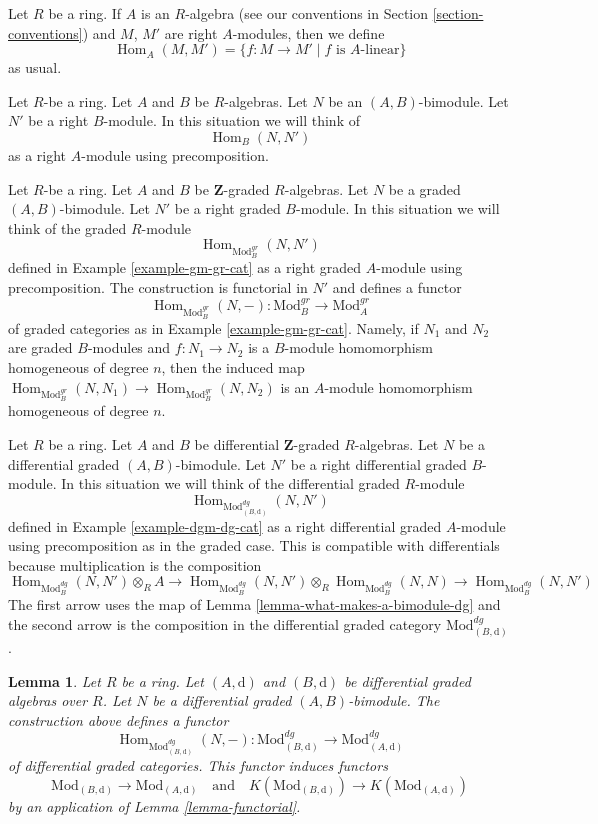 \documentclass{stacks-project}
\theoremstyle{plain}
\newtheorem{lemma}[subsection]{Lemma}
\theoremstyle{definition}
\theoremstyle{remark}
\numberwithin{equation}{subsection}
\def\Hom{\mathop{\mathrm{Hom}}\nolimits}
\begin{document}
\noindent
Let $R$ be a ring. If $A$ is an $R$-algebra (see our conventions
in Section \ref{section-conventions}) and $M$, $M'$ are right
$A$-modules, then we define
$$
\Hom_A(M, M') = \{f : M \to M' \mid f \text{ is }A\text{-linear}\}
$$
as usual.

\medskip\noindent
Let $R$-be a ring. Let $A$ and $B$ be $R$-algebras. Let
$N$ be an $(A, B)$-bimodule. Let $N'$ be a right $B$-module.
In this situation we will think of
$$
\Hom_B(N, N')
$$
as a right $A$-module using precomposition.

\medskip\noindent
Let $R$-be a ring. Let $A$ and $B$ be $\mathbf{Z}$-graded $R$-algebras. Let
$N$ be a graded $(A, B)$-bimodule. Let $N'$ be a right graded $B$-module.
In this situation we will think of the graded $R$-module
$$
\Hom_{\text{Mod}^{gr}_B}(N, N')
$$
defined in Example \ref{example-gm-gr-cat} as a right graded $A$-module
using precomposition. The construction is functorial in $N'$ and defines
a functor
$$
\Hom_{\text{Mod}^{gr}_B}(N, -) :
\text{Mod}^{gr}_B
\longrightarrow
\text{Mod}^{gr}_A
$$
of graded categories as in Example \ref{example-gm-gr-cat}. Namely, if
$N_1$ and $N_2$ are graded $B$-modules and $f : N_1 \to N_2$ is a $B$-module
homomorphism homogeneous of degree $n$, then the induced map
$\Hom_{\text{Mod}^{gr}_B}(N, N_1) \to \Hom_{\text{Mod}^{gr}_B}(N, N_2)$
is an $A$-module homomorphism homogeneous of degree $n$.

\medskip\noindent
Let $R$ be a ring. Let $A$ and $B$ be differential $\mathbf{Z}$-graded
$R$-algebras. Let $N$ be a differential graded $(A, B)$-bimodule.
Let $N'$ be a right differential graded $B$-module. In this situation
we will think of the differential graded $R$-module
$$
\Hom_{\text{Mod}^{dg}_{(B, \text{d})}}(N, N')
$$
defined in Example \ref{example-dgm-dg-cat} as a right differential
graded $A$-module using precomposition as in the graded case. This
is compatible with differentials because multiplication is the
composition
$$
\Hom_{\text{Mod}^{dg}_B}(N, N') \otimes_R A \to
\Hom_{\text{Mod}^{dg}_B}(N, N') \otimes_R
\Hom_{\text{Mod}^{dg}_B}(N, N) \to
\Hom_{\text{Mod}^{dg}_B}(N, N')
$$
The first arrow uses the map
of Lemma \ref{lemma-what-makes-a-bimodule-dg} and the second
arrow is the composition in the differential graded category
$\text{Mod}^{dg}_{(B, \text{d})}$.

\begin{lemma}
\label{lemma-hom}
Let $R$ be a ring. Let $(A, \text{d})$ and $(B, \text{d})$
be differential graded algebras over $R$. Let $N$ be a
differential graded $(A, B)$-bimodule. The construction above
defines a functor
$$
\Hom_{\text{Mod}^{dg}_{(B, \text{d})}}(N, -) :
\text{Mod}^{dg}_{(B, \text{d})}
\longrightarrow
\text{Mod}^{dg}_{(A, \text{d})}
$$
of differential graded categories. This functor induces functors
$$
\text{Mod}_{(B, \text{d})} \to \text{Mod}_{(A, \text{d})}
\quad\text{and}\quad
K(\text{Mod}_{(B, \text{d})}) \to K(\text{Mod}_{(A, \text{d})})
$$
by an application of Lemma \ref{lemma-functorial}.
\end{lemma}
\end{document}
